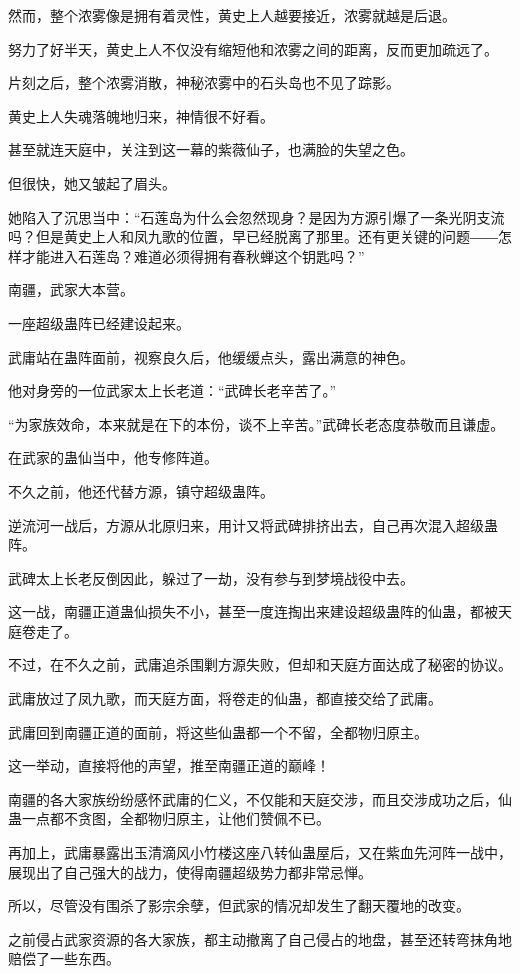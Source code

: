 \begin{this_body}
然而，整个浓雾像是拥有着灵性，黄史上人越要接近，浓雾就越是后退。

努力了好半天，黄史上人不仅没有缩短他和浓雾之间的距离，反而更加疏远了。

片刻之后，整个浓雾消散，神秘浓雾中的石头岛也不见了踪影。

黄史上人失魂落魄地归来，神情很不好看。

甚至就连天庭中，关注到这一幕的紫薇仙子，也满脸的失望之色。

但很快，她又皱起了眉头。

她陷入了沉思当中：“石莲岛为什么会忽然现身？是因为方源引爆了一条光阴支流吗？但是黄史上人和凤九歌的位置，早已经脱离了那里。还有更关键的问题――怎样才能进入石莲岛？难道必须得拥有春秋蝉这个钥匙吗？”

南疆，武家大本营。

一座超级蛊阵已经建设起来。

武庸站在蛊阵面前，视察良久后，他缓缓点头，露出满意的神色。

他对身旁的一位武家太上长老道：“武碑长老辛苦了。”

“为家族效命，本来就是在下的本份，谈不上辛苦。”武碑长老态度恭敬而且谦虚。

在武家的蛊仙当中，他专修阵道。

不久之前，他还代替方源，镇守超级蛊阵。

逆流河一战后，方源从北原归来，用计又将武碑排挤出去，自己再次混入超级蛊阵。

武碑太上长老反倒因此，躲过了一劫，没有参与到梦境战役中去。

这一战，南疆正道蛊仙损失不小，甚至一度连掏出来建设超级蛊阵的仙蛊，都被天庭卷走了。

不过，在不久之前，武庸追杀围剿方源失败，但却和天庭方面达成了秘密的协议。

武庸放过了凤九歌，而天庭方面，将卷走的仙蛊，都直接交给了武庸。

武庸回到南疆正道的面前，将这些仙蛊都一个不留，全都物归原主。

这一举动，直接将他的声望，推至南疆正道的巅峰！

南疆的各大家族纷纷感怀武庸的仁义，不仅能和天庭交涉，而且交涉成功之后，仙蛊一点都不贪图，全都物归原主，让他们赞佩不已。

再加上，武庸暴露出玉清滴风小竹楼这座八转仙蛊屋后，又在紫血先河阵一战中，展现出了自己强大的战力，使得南疆超级势力都非常忌惮。

所以，尽管没有围杀了影宗余孽，但武家的情况却发生了翻天覆地的改变。

之前侵占武家资源的各大家族，都主动撤离了自己侵占的地盘，甚至还转弯抹角地赔偿了一些东西。


\end{this_body}
